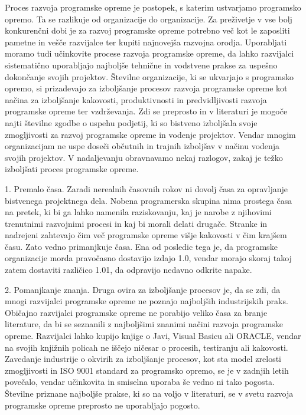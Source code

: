 \documentclass[a4paper,12pt,openright]{book}
\begin{document}
Proces razvoja programske opreme je postopek, s katerim ustvarjamo programsko opremo. Ta se razlikuje od organizacije do organizacije. Za preživetje v vse bolj konkurenčni dobi je za razvoj programske opreme potrebno več kot le zaposliti pametne in vešče razvijalce ter kupiti najnovejša razvojna orodja. Uporabljati moramo tudi učinkovite procese razvoja programske opreme, da lahko razvijalci sistematično uporabljajo najboljše tehnične in vodstvene prakse za uspešno dokončanje svojih projektov. Številne organizacije, ki se ukvarjajo s programsko opremo, si prizadevajo za izboljšanje procesov razvoja programske opreme kot načina za izboljšanje kakovosti, produktivnosti in predvidljivosti razvoja programske opreme ter vzdrževanja.
Zdi se preprosto in v literaturi je mogoče najti številne zgodbe o uspehu podjetij, ki so bistveno izboljšala svoje zmogljivosti za razvoj programske opreme in vodenje projektov. Vendar mnogim organizacijam ne uspe doseči občutnih in trajnih izboljšav v načinu vodenja svojih projektov. V nadaljevanju obravnavamo nekaj razlogov, zakaj je težko izboljšati proces programske opreme.
\cite{aggarwal2005software, humphrey1989managing}

1. Premalo časa. Zaradi nerealnih časovnih rokov ni dovolj časa za opravljanje bistvenega projektnega dela. Nobena programerska skupina nima prostega časa na pretek, ki bi ga lahko namenila raziskovanju, kaj je narobe z njihovimi trenutnimi razvojnimi procesi in kaj bi morali delati drugače. Stranke in nadrejeni zahtevajo čim več programske opreme višje kakovosti v čim krajšem času. Zato vedno primanjkuje časa. Ena od posledic tega je, da programske organizacije morda pravočasno dostavijo izdajo 1.0, vendar morajo skoraj takoj zatem dostaviti različico 1.01, da odpravijo nedavno odkrite napake.

2. Pomanjkanje znanja. Druga ovira za izboljšanje procesov je, da se zdi, da mnogi razvijalci programske opreme ne poznajo najboljših industrijskih praks. Običajno razvijalci programske opreme ne porabijo veliko časa za branje literature, da bi se seznanili z najboljšimi znanimi načini razvoja programske opreme. Razvijalci lahko kupijo knjige o Javi, Visual Basicu ali ORACLE, vendar na svojih knjižnih policah ne iščejo ničesar o procesih, testiranju ali kakovosti.
Zavedanje industrije o okvirih za izboljšanje procesov, kot sta model zrelosti zmogljivosti in ISO 9001 standard za programsko opremo, se je v zadnjih letih povečalo, vendar učinkovita in smiselna uporaba še vedno ni tako pogosta. Številne priznane najboljše prakse, ki so na voljo v literaturi, se v svetu razvoja programske opreme preprosto ne uporabljajo pogosto.
\cite{aggarwal2005software}
\end{document}
